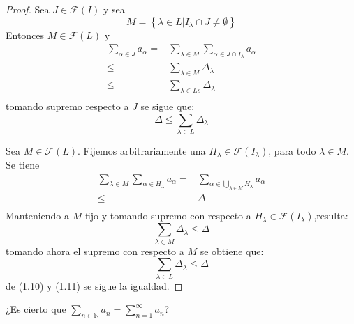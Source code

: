 \documentclass[12pt]{report}
\newcounter{it}
\theoremstyle{largebreak}
\begin{document}
    \begin{proof}
        Sea $J\in\mathcal{F}(I)$ y sea
        \begin{equation*}
            M=\left\{\lambda\in L\big|I_\lambda\cap J\neq\emptyset \right\}
        \end{equation*}
        Entonces $M\in \mathcal{F}(L)$ y
        \begin{equation*}
            \begin{split}
                \sum_{\alpha\in J}a_\alpha=&\sum_{\lambda\in M} \sum_{\alpha\in J\cap I_\lambda}a_\alpha\\
                \leq&\sum_{\lambda\in M}\Delta_\lambda\\
                \leq&\sum_{\lambda\in Ls}\Delta_\lambda\\
            \end{split}
        \end{equation*}
        tomando supremo respecto a $J$ se sigue que:
        \begin{equation}
            \Delta\leq\sum_{\lambda\in L}\Delta_\lambda
        \end{equation}

        Sea $M\in\mathcal{F}(L)$. Fijemos arbitrariamente una $H_\lambda\in\mathcal{F}(I_\lambda)$, para todo $\lambda\in M$. Se tiene
        \begin{equation*}
            \begin{split}
                \sum_{\lambda\in M}\sum_{\alpha\in H_\lambda}a_\alpha=&\sum_{\alpha\in \bigcup_{\lambda\in M}H_\lambda}a_\alpha\\
                \leq&\Delta\\
            \end{split}
        \end{equation*}
        Manteniendo a $M$ fijo y tomando supremo con respecto a $H_\lambda\in\mathcal{F}(I_\lambda)$,resulta:
        \begin{equation*}
            \sum_{\lambda\in M}\Delta_\lambda\leq\Delta
        \end{equation*}
        tomando ahora el supremo con respecto a $M$ se obtiene que:
        \begin{equation}
            \sum_{\lambda\in L}\Delta_\lambda\leq\Delta
        \end{equation}
        de (1.10) y (1.11) se sigue la igualdad.

    \end{proof}

    \begin{exa}
        ¿Es cierto que $\sum_{n\in\mathbb{N}}a_n=\sum_{n=1}^{\infty}a_n$?
    \end{exa}
\end{document}
